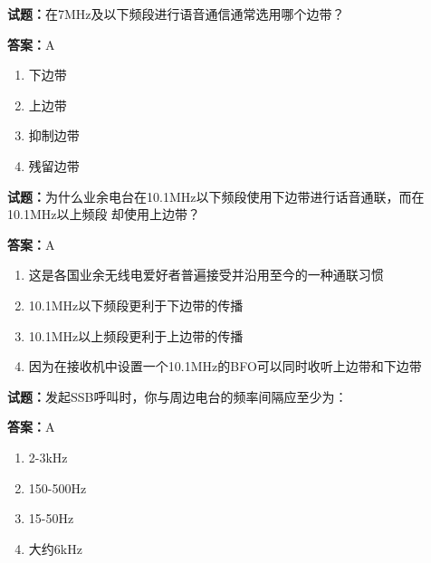 \documentclass{ctexbook}
\begin{document}




\vspace{1em}

\textbf{试题：}在7MHz及以下频段进行语音通信通常选用哪个边带？ 

\textbf{答案：}A 

\begin{enumerate}[leftmargin=3em]
  \item 下边带 


  \item 上边带 

  \item 抑制边带 

  \item 残留边带 

\end{enumerate}





\vspace{1em}

\textbf{试题：}为什么业余电台在10.1MHz以下频段使用下边带进行话音通联，而在10.1MHz以上频段
却使用上边带？ 

\textbf{答案：}A 

\begin{enumerate}[leftmargin=3em]
  \item 这是各国业余无线电爱好者普遍接受并沿用至今的一种通联习惯 

  \item 10.1MHz以下频段更利于下边带的传播 

  \item 10.1MHz以上频段更利于上边带的传播 

  \item 因为在接收机中设置一个10.1MHz的BFO可以同时收听上边带和下边带 

\end{enumerate}





\vspace{1em}

\textbf{试题：}发起SSB呼叫时，你与周边电台的频率间隔应至少为： 

\textbf{答案：}A 

\begin{enumerate}[leftmargin=3em]
  \item 2-3kHz 

  \item 150-500Hz 

  \item 15-50Hz 

  \item 大约6kHz 

\end{enumerate}
\end{document}
